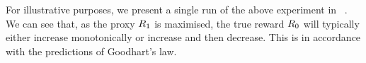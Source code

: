 For illustrative purposes, we present a single run of the above experiment in ~. We can see that, as the proxy $R_1$ is maximised, the true reward $R_0$ will typically either increase monotonically or increase and then decrease. This is in accordance with the predictions of Goodhart's law.

